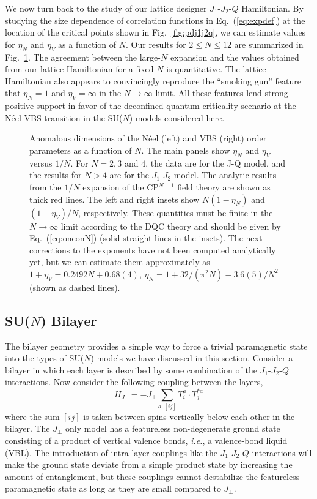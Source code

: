 \documentclass[range]{ar2e}
\begin{document}
We now turn back to the study of our lattice designer $J_1$-$J_2$-$Q$
Hamiltonian. By studying the size dependence of correlation functions in Eq.~(\ref{eq:expdef})
 at the location of the critical points shown in Fig.~\ref{fig:pdj1j2q}, we can
 estimate values for $\eta_N$ and $\eta_V$ as a function
 of $N$. Our results for $2\leq N \leq 12$ are summarized in Fig.~\ref{fig:exp}. The
 agreement between the large-$N$ expansion and the values obtained from our
 lattice Hamiltonian for a fixed $N$ is quantitative. The lattice
 Hamiltonian also appears to convincingly reproduce the ``smoking gun'' feature that
 $\eta_N=1$ and $\eta_V=\infty$ in the $N\rightarrow \infty$
 limit. All these features lend strong positive support in favor of
 the deconfined quantum criticality scenario at the N\'eel-VBS
 transition in the SU($N$) models considered here.



\begin{figure}
\centerline{}
 \caption{ \label{fig:exp} Anomalous dimensions of the N\'eel (left)
    and VBS (right)
  order parameters as a function of $N$. The main panels show $\eta_N$ and $\eta_V$ versus $1/N$. For $N=2,3$ and $4$, the data are 
  for the J-Q model, and the results for $N>4$ are for the $J_1$-$J_2$ model. The analytic results 
  from the $1/N$ expansion of the CP$^{N-1}$ field theory are shown as thick red lines. The left and right insets 
  show $N(1-\eta_N)$ and $(1+\eta_V)/N$, respectively. These quantities must be finite in the  $N\rightarrow \infty$ 
  limit according to the DQC theory and should be given by Eq.~(\ref{eq:oneonN}) (solid straight lines in the insets). 
  The next corrections to the exponents have not been computed analytically yet, but we can estimate them approximately 
  as $1+\eta_V = 0.2492 N + 0.68(4)$, $\eta_N = 1+32/(\pi^2 N)-3.6(5)/N^2$ (shown as dashed lines).}
\end{figure}

\subsection{SU($N$) Bilayer}
\label{ss:bilN}

The bilayer geometry provides a simple way to force a trivial paramagnetic
state into the types of SU($N$) models we have discussed in this
section. Consider a bilayer in which each layer is described by some
combination of the $J_1$-$J_2$-$Q$ interactions. Now consider the
following coupling between the layers,
\begin{equation}
 H_{J_\perp} = -J_\perp \sum_{a,[ij]} T^a_i\cdot T^{*a}_j
\end{equation}
where the sum $[ij]$ is taken between spins vertically below each other
in the bilayer. The $J_\perp$ only model has a featureless non-degenerate ground state
consisting of a product of vertical valence bonds, {\em i.e.}, a valence-bond liquid (VBL). The introduction of intra-layer couplings like the $J_1$-$J_2$-$Q$ interactions will
make the ground state deviate from a simple product state by
increasing the amount of entanglement, but these couplings
 cannot destabilize the featureless paramagnetic
state as long as they are small compared to $J_\perp$. 
\end{document}
